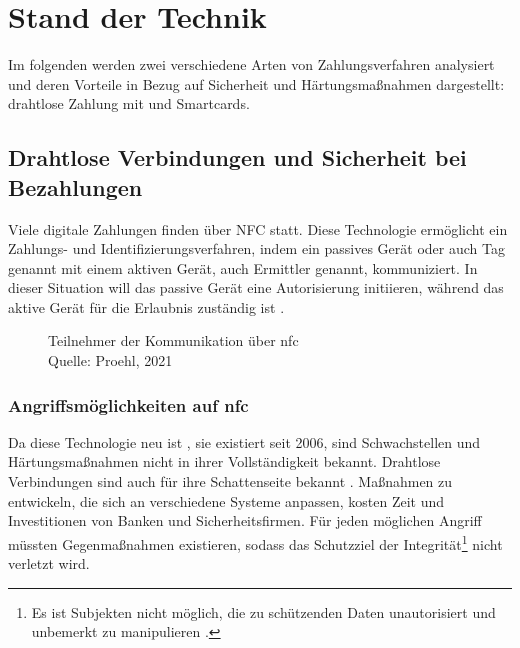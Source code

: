 \section{Stand der Technik}

Im folgenden werden zwei verschiedene Arten von Zahlungsverfahren analysiert und deren
Vorteile in Bezug auf Sicherheit und Härtungsmaßnahmen dargestellt: drahtlose Zahlung mit und 
Smartcards.

\subsection{Drahtlose Verbindungen und Sicherheit bei Bezahlungen}

Viele digitale Zahlungen finden über NFC statt. Diese Technologie ermöglicht ein Zahlungs- und
Identifizierungsverfahren, indem ein passives Gerät oder auch Tag genannt mit einem aktiven Gerät,
auch Ermittler genannt, kommuniziert. In dieser Situation will das passive Gerät eine Autorisierung initiieren,
während das aktive Gerät für die Erlaubnis zuständig ist \cite{refart:NFNK}. 

\begin{figure}[H]
   \caption{Teilnehmer der Kommunikation über \acrshort{nfc}\\Quelle: Proehl, 2021}
   \label{fig:refart_GPIN}
\end{figure}

\subsubsection{Angriffsmöglichkeiten auf \acrshort{nfc}}

Da diese Technologie neu ist \cite{refip:NTAS}, sie existiert seit 2006, sind Schwachstellen 
und Härtungsmaßnahmen nicht in ihrer Vollständigkeit bekannt. Drahtlose Verbindungen sind auch für ihre 
Schattenseite bekannt \cite{refip:NYRS}. Maßnahmen zu entwickeln, die sich an verschiedene Systeme anpassen,
kosten Zeit und Investitionen von Banken und Sicherheitsfirmen. Für jeden möglichen Angriff müssten 
Gegenmaßnahmen existieren, sodass das Schutzziel der Integrität\footnote{Es ist Subjekten nicht möglich, 
die zu schützenden Daten unautorisiert und unbemerkt zu manipulieren \cite{refbook:SWIS}.} nicht verletzt wird.

